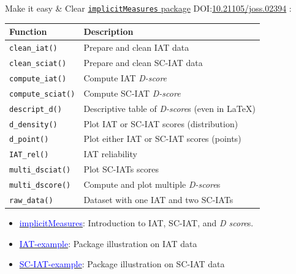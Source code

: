 \documentclass{beamer}
\begin{document}
\begin{frame}{Make it easy \& Clear}
	\href{https://cran.r-project.org/web/packages/implicitMeasures/index.html}{\texttt{implicitMeasures} package} DOI:\href{https://joss.theoj.org/papers/10.21105/joss.02394}{10.21105/joss.02394} : 
	
	\vspace{2mm}
	\begin{small}
		\begin{tabular}{p{2.3cm}p{8cm}}
			\hline
			Function & Description \\
			\hline
			\texttt{clean\_iat()} & Prepare and clean IAT data\\
			\texttt{clean\_sciat()} & Prepare and clean SC-IAT data\\
			\texttt{compute\_iat()} & Compute IAT \emph{D-score}\\
			\texttt{compute\_sciat()} & Compute SC-IAT \emph{D-score} \\
			\texttt{descript\_d()} & Descriptive table of \emph{D-score}s (even in \LaTeX) \\  
			\texttt{d\_density()} & Plot IAT or SC-IAT scores (distribution)\\
			\texttt{d\_point()} & Plot either IAT or SC-IAT scores (points)\\
			\texttt{IAT\_rel()} & IAT reliability\\
			\texttt{multi\_dsciat()} & Plot SC-IATs scores\\
			\texttt{multi\_dscore()} & Compute and plot multiple \emph{D-score}s\\
			\texttt{raw\_data()} & Dataset with one IAT and two SC-IATs\\
			\hline
		\end{tabular}
	\end{small}
	
	\begin{small}
		\begin{itemize}
			\item \href{https://cran.r-project.org/web/packages/implicitMeasures/vignettes/implicitMeasures.html}{\textcolor{blue}{implicitMeasures}}: Introduction to IAT, SC-IAT, and \emph{D score}s.
			\item \href{https://cran.r-project.org/web/packages/implicitMeasures/vignettes/IAT-example.html}{\textcolor{blue}{IAT-example}}: Package illustration on IAT data
			\item \href{https://cran.r-project.org/web/packages/implicitMeasures/vignettes/SC-IAT-example.html}{\textcolor{blue}{SC-IAT-example}}: Package illustration on SC-IAT data
		\end{itemize}
	\end{small}
\end{frame}
\end{document}
